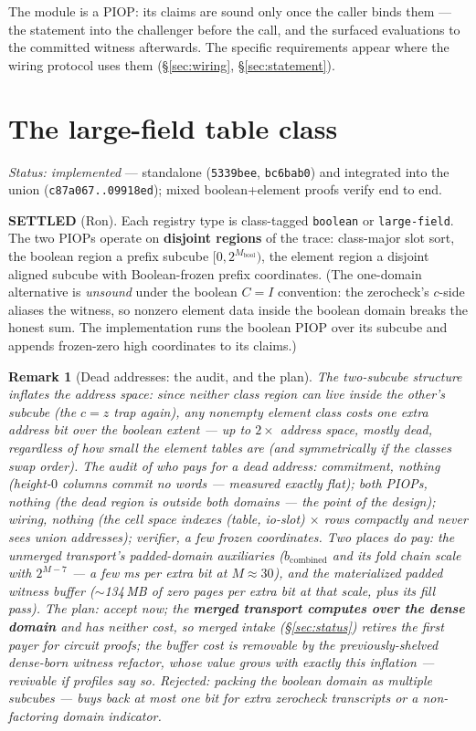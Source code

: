 \documentclass[11pt]{article}
\newcommand{\code}[1]{\texttt{#1}}
\newcommand{\settled}[1]{\medskip\noindent\textbf{SETTLED} (#1).\xspace}
\newtheorem{remark}{Remark}
\theoremstyle{definition}
\begin{document}
The module is a PIOP: its claims are sound only once the caller binds them
--- the statement into the challenger before the call, and the surfaced
evaluations to the committed witness afterwards. The specific requirements
appear where the wiring protocol uses them (\S\ref{sec:wiring},
\S\ref{sec:statement}).

\section{The large-field table class}\label{sec:element}

\emph{Status: implemented} — standalone (\code{5339bee}, \code{bc6bab0})
and integrated into the union (\code{c87a067..09918ed}); mixed
boolean+element proofs verify end to end.

\settled{Ron} Each registry type is class-tagged \code{boolean} or
\code{large-field}. The two PIOPs operate on \textbf{disjoint regions} of
the trace: class-major slot sort, the boolean region a prefix subcube
$[0, 2^{M_{\mathrm{bool}}})$, the element region a disjoint aligned
subcube with Boolean-frozen prefix coordinates. (The one-domain
alternative is \emph{unsound} under the boolean $C{=}I$ convention: the
zerocheck's $c$-side aliases the witness, so nonzero element data inside
the boolean domain breaks the honest sum. The implementation runs the
boolean PIOP over its subcube and appends frozen-zero high coordinates to
its claims.)

\begin{remark}[Dead addresses: the audit, and the plan]\label{rem:dead}
The two-subcube structure inflates the address space: since neither
class region can live inside the other's subcube (the $c{=}z$ trap
again), \emph{any} nonempty element class costs one extra address bit
over the boolean extent --- up to $2\times$ address space, mostly dead,
regardless of how small the element tables are (and symmetrically if the
classes swap order). The audit of who pays for a dead address:
commitment, \emph{nothing} (height-$0$ columns commit no words ---
measured exactly flat); both PIOPs, \emph{nothing} (the dead region is
outside both domains --- the point of the design); wiring,
\emph{nothing} (the cell space indexes (table, io-slot) $\times$ rows
compactly and never sees union addresses); verifier, a few frozen
coordinates. Two places do pay: the \emph{unmerged} transport's
padded-domain auxiliaries ($b_{\mathrm{combined}}$ and its fold chain
scale with $2^{M-7}$ --- a few ms per extra bit at $M \approx 30$), and
the materialized padded witness buffer ($\sim$134\,MB of zero pages per
extra bit at that scale, plus its fill pass). The plan: accept now;
the \textbf{merged transport computes over the dense domain} and has
neither cost, so merged intake (\S\ref{sec:status}) retires the first
payer for circuit proofs; the buffer cost is removable by the
previously-shelved dense-born witness refactor, whose value grows with
exactly this inflation --- revivable if profiles say so. Rejected:
packing the boolean domain as multiple subcubes --- buys back at most
one bit for extra zerocheck transcripts or a non-factoring domain
indicator.
\end{remark}
\end{document}
